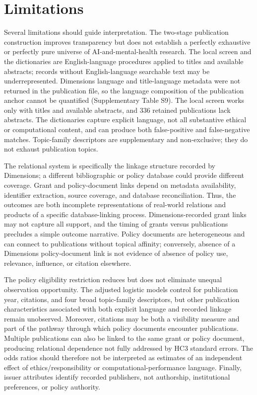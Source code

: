 \documentclass[12pt]{article}
\begin{document}
\section{Limitations}

Several limitations should guide interpretation. The two-stage publication construction improves transparency but does not establish a perfectly exhaustive or perfectly pure universe of AI-and-mental-health research. The local screen and the dictionaries are English-language procedures applied to titles and available abstracts; records without English-language searchable text may be underrepresented. Dimensions language and title-language metadata were not returned in the publication file, so the language composition of the publication anchor cannot be quantified (Supplementary Table S9). The local screen works only with titles and available abstracts, and 336 retained publications lack abstracts. The dictionaries capture explicit language, not all substantive ethical or computational content, and can produce both false-positive and false-negative matches. Topic-family descriptors are supplementary and non-exclusive; they do not exhaust publication topics.

The relational system is specifically the linkage structure recorded by Dimensions; a different bibliographic or policy database could provide different coverage. Grant and policy-document links depend on metadata availability, identifier extraction, source coverage, and database reconciliation. Thus, the outcomes are both incomplete representations of real-world relations and products of a specific database-linking process. Dimensions-recorded grant links may not capture all support, and the timing of grants versus publications precludes a simple outcome narrative. Policy documents are heterogeneous and can connect to publications without topical affinity; conversely, absence of a Dimensions policy-document link is not evidence of absence of policy use, relevance, influence, or citation elsewhere.

The policy eligibility restriction reduces but does not eliminate unequal observation opportunity. The adjusted logistic models control for publication year, citations, and four broad topic-family descriptors, but other publication characteristics associated with both explicit language and recorded linkage remain unobserved. Moreover, citations may be both a visibility measure and part of the pathway through which policy documents encounter publications. Multiple publications can also be linked to the same grant or policy document, producing relational dependence not fully addressed by HC3 standard errors. The odds ratios should therefore not be interpreted as estimates of an independent effect of ethics/responsibility or computational-performance language. Finally, issuer attributes identify recorded publishers, not authorship, institutional preferences, or policy authority.
\end{document}
